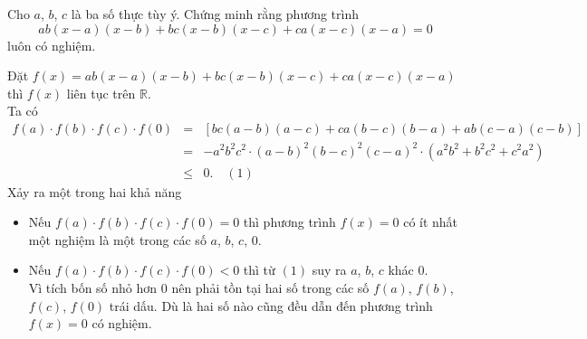 \begin{bt}%
Cho $a$, $b$, $c$ là ba số thực tùy ý. Chứng minh rằng phương trình
\[ab(x-a)(x-b)+bc(x-b)(x-c)+ca(x-c)(x-a)=0\] luôn có nghiệm.
\loigiai
{Đặt $f(x)=ab(x-a)(x-b)+bc(x-b)(x-c)+ca(x-c)(x-a)$ thì $f(x)$ liên tục trên $\mathbb{R}$.\\ 
Ta có 
\begin{eqnarray*}
f(a)\cdot f(b)\cdot f(c)\cdot f(0)&=&\left[bc(a-b)(a-c)+ca(b-c)(b-a)+ab(c-a)(c-b)\right]\\
&=&-a^2 b^2c^2\cdot (a-b)^2(b-c)^2(c-a)^2\cdot \left(a^2b^2+b^2c^2+c^2a^2\right)\\
&\le & 0.\quad (1)
\end{eqnarray*}
Xảy ra một trong hai khả năng
\begin{itemize}
\item[•] Nếu $f(a)\cdot f(b)\cdot f(c)\cdot f(0)=0$ thì phương trình $f(x)=0$ có ít nhất một nghiệm là một trong các số $a$, $b$, $c$, $0$.
\item[•] Nếu $f(a)\cdot f(b)\cdot f(c)\cdot f(0)<0$ thì từ $(1)$ suy ra $a$, $b$, $c$ khác $0$.\\
Vì tích bốn số nhỏ hơn $0$ nên phải tồn tại hai số trong các số $f(a)$, $ f(b)$, $f(c)$, $f(0)$ trái dấu. Dù là hai số nào cũng đều dẫn đến phương trình $f(x)=0$ có nghiệm.
\end{itemize}
}
\end{bt}

